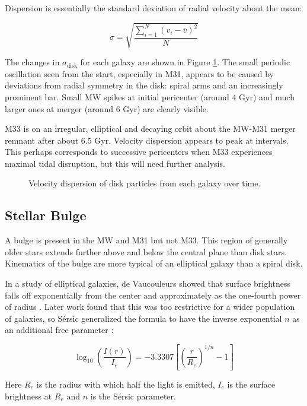 \documentclass[twocolumn]{aastex63}
\begin{document}
Dispersion is essentially the standard deviation of radial velocity about the mean:

\[ \sigma = \sqrt{ \frac{\sum_{i=1}^N(v_i - \bar{v})^2}{N} } \]

The changes in $\sigma_{\text{disk}}$ for each galaxy are shown in Figure \ref{fig:vel_disp}. The small periodic oscillation seen from the start, especially in M31, appears to be caused by deviations from radial symmetry in the disk: spiral arms and an increasingly prominent bar. Small MW spikes at initial pericenter (around 4 Gyr) and much larger ones at merger (around 6 Gyr) are clearly visible.

M33 is on an irregular, elliptical and decaying orbit about the MW-M31 merger remnant after about 6.5 Gyr. Velocity dispersion appears to peak at intervals. This perhaps corresponds to successive pericenters when M33 experiences maximal tidal disruption, but this will need further analysis.

\begin{figure}[htb!]
	\caption{Velocity dispersion of disk particles from each galaxy over time.
		\label{fig:vel_disp}}
\end{figure}


\subsection{Stellar Bulge}

A bulge is present in the MW and M31 but not M33. This region of generally older stars extends further above and below the central plane than disk stars. Kinematics of the bulge are more typical of an elliptical galaxy than a spiral disk.

In a study of elliptical galaxies, de Vaucouleurs showed that surface brightness falls off exponentially from the center and approximately as the one-fourth power of radius \citep{de_vaucouleurs_recherches_1948}. Later work found that this was too restrictive for a wider population of galaxies, so Sérsic generalized the formula to have the inverse exponential $n$ as an additional free parameter \citep{sersic_influence_1963}:

\[ \log_{10} \left( \frac{I(r)}{I_e} \right) =  -3.3307 \left[ \left( \frac{r}{R_e} \right)^{1/n} - 1 \right] \]

Here $R_e$ is the radius with which half the light is emitted,  $I_e$ is the surface brightness at $R_e$ and $n$ is the Sérsic parameter.
\end{document}
